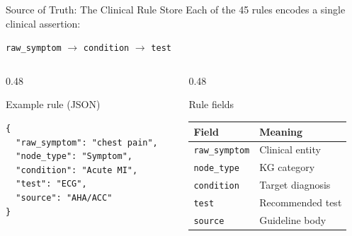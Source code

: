 \documentclass[aspectratio=169]{beamer}
\begin{document}
\begin{frame}[fragile]{Source of Truth: The Clinical Rule Store}
  Each of the 45 rules encodes a single clinical assertion:

  \vspace{0.3em}
  \begin{center}
    \texttt{raw\_symptom} \;\(\longrightarrow\)\; \texttt{condition} \;\(\longrightarrow\)\; \texttt{test}
  \end{center}

  \vspace{0.3em}
  \begin{columns}[T]
    \begin{column}{0.48\textwidth}
      \begin{exampleblock}{Example rule (JSON)}
        \begin{lstlisting}[language={}]
{
  "raw_symptom": "chest pain",
  "node_type": "Symptom",
  "condition": "Acute MI",
  "test": "ECG",
  "source": "AHA/ACC"
}
        \end{lstlisting}
      \end{exampleblock}
    \end{column}
    \begin{column}{0.48\textwidth}
      \begin{block}{Rule fields}
        \small
        \begin{tabular}{@{}ll@{}}
          \textbf{Field}      & \textbf{Meaning} \\
          \midrule
          \texttt{raw\_symptom} & Clinical entity \\
          \texttt{node\_type}   & KG category \\
          \texttt{condition}    & Target diagnosis \\
          \texttt{test}         & Recommended test \\
          \texttt{source}       & Guideline body \\
        \end{tabular}
      \end{block}
    \end{column}
  \end{columns}
\end{frame}
\end{document}
